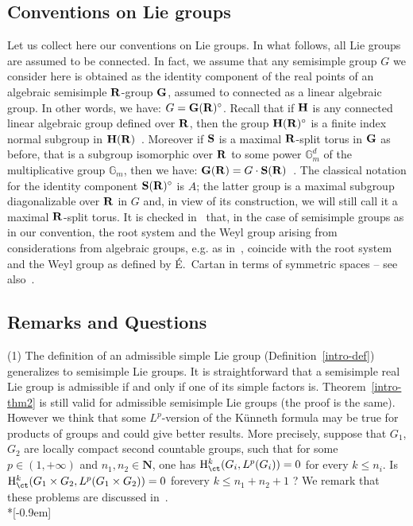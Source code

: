 \subsection*{Conventions on Lie groups}

Let us collect here our conventions on Lie groups. In what follows, all Lie groups are assumed to be connected. In fact, we assume that any semisimple group $G$ we consider here is obtained as the identity component of the real points of an algebraic semisimple ${\bf R}$-group ${\bf G}$, assumed to connected as a linear algebraic group. In other words, we have: $G = {\bf G}({\bf R})^\circ$. Recall that if ${\bf H}$ is any connected linear algebraic group defined over ${\bf R}$, then the group ${\bf H}({\bf R})^\circ$ is a finite index normal subgroup in ${\bf H}({\bf R})$~\cite[14.1]{BoTi}. Moreover if ${\bf S}$ is a maximal ${\bf R}$-split torus in ${\bf G}$ as before, that is a subgroup isomorphic over ${\bf R}$ to some power ${\mathbb G}_m^d$ of the multiplicative group ${\mathbb G}_m$, then we have: ${\bf G}({\bf R}) = G \cdot {\bf S}({\bf R})$~\cite[Theorem~14.4]{BoTi}. The classical notation for the identity component ${\bf S}({\bf R})^\circ$ is $A$; the latter group is a maximal subgroup diagonalizable over ${\bf R}$ in $G$ and, in view of its construction, we will still call it a maximal ${\bf R}$-split torus. It is checked in~\cite[14.7]{BoTi} that, in the case of semisimple groups as in our convention, the root system and the Weyl group arising from considerations from algebraic groups, e.g. as in~\cite[\textsection~21]{Borel-LAG}, coincide with the root system and the Weyl group as defined by É.~Cartan in terms of symmetric spaces -- see also~\cite[\textsection~24.C]{Borel-LAG}.


\subsection*{Remarks and Questions}

(1) The definition of an admissible simple Lie group (Definition~\ref{intro-def}) generalizes to semisimple Lie groups. It is straightforward that a semisimple real Lie group is admissible if and only if one of its simple factors is. Theorem~\ref{intro-thm2} is still valid for admissible semisimple Lie groups (the proof is the same). However we think that some $L^p$-version of the K\"unneth formula may be true for products of groups and could give better results. More precisely, suppose that $G_1$, $G_2$ are locally compact second countable groups, such that for some $p \in (1, +\infty)$ and $n_1, n_2 \in \mathbf N$, one has ${\rm H}^k_{\ct} (G_i, L^p(G_i)) =0$ for every $k\le n_i$. Is ${\rm H}^k _{\ct} (G_1 \times G_2, L^p(G_1 \times G_2)) =0$ for\linebreak every $k \le n_1 + n_2 +1$ ? We remark that these problems are discussed in~\cite[p.~252]{G}.\ \\*[-0.9em]

